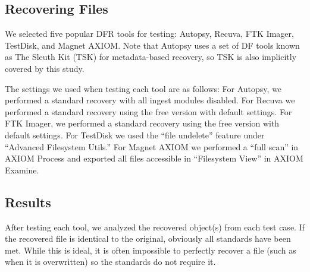
\subsection{Recovering Files}

We selected five popular DFR tools for testing: Autopsy\cite{autopsy}, Recuva\cite{recuva}, FTK Imager\cite{ftk}, TestDisk\cite{testdisk}, and Magnet AXIOM\cite{axiom}. Note that Autopsy uses a set of DF tools known as The Sleuth Kit (TSK) for metadata-based recovery, so TSK is also implicitly covered by this study.

The settings we used when testing each tool are as follows:
For Autopsy, we performed a standard recovery with all ingest modules disabled.
For Recuva we performed a standard recovery using the free version with default settings.
For FTK Imager, we performed a standard recovery using the free version with default settings.
For TestDisk we used the ``file undelete'' feature under ``Advanced Filesystem Utils.''
For Magnet AXIOM we performed a ``full scan'' in AXIOM Process and exported all files accessible in ``Filesystem View'' in AXIOM Examine.

\subsection{Results}

After testing each tool, we analyzed the recovered object(s) from each test case. 
If the recovered file is identical to the original, obviously all standards have been met. 
While this is ideal, it is often impossible to perfectly recover a file (such as when it is overwritten) so the standards do not require it. 


